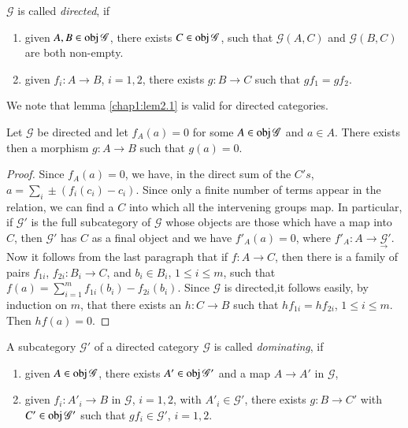 \begin{defi*}%
$\mathscr{G}$ is called {\em directed}, if 
\begin{enumerate}
\renewcommand{\labelenumi}{(\theenumi)}
\item given $A, B \in \operatorname{obj} \mathscr{G}$, there exists $C \in \operatorname{obj}
  \mathscr{G}$, such that $\mathscr{G}(A, C)$ and $\mathscr{G}(B, C)$
  are both non-empty. 

\item given $f_i : A \to B$, $i=1, 2$, there exists $g : B \to C $ such
  that $gf_1 = gf_2$. 
\end{enumerate}
\end{defi*}

We note that lemma \ref{chap1:lem2.1} is valid for directed
categories. 

\begin{lemma}\label{chap1:lem2.2} %
Let $\mathscr{G}$ be directed and let $f_A(a) = 0$ for some $A \in \operatorname{obj}
\mathscr{G}$ and $a \in A$. There exists then a morphism $g : A \to B$
such that $g(a) = 0$. 
\end{lemma}

\begin{proof}
Since $f_A(a) = 0$, we have, in the direct sum of the $C's$, $a = \sum
\limits_i \pm (f_i (c_i)-c_i)$. Since only a finite number of terms
appear in the relation, we can find a $C$ into which all the
intervening groups map. In particular, if $\mathscr{G}'$ is the full
subcategory of $\mathscr{G}$ whose objects are those which have a map into
$C$, then $\mathscr{G}'$ has $C$ as a final object and we have
$f'_A(a) =0$, where $f'_A : A \to \underset \to {\mathscr{G}}'$. Now
it follows from the last paragraph that if $f : A \to C$, then there
is a family of pairs $f_{1i}$, $f_{2i} : B_i \to C$, and $b_i \in
B_i$, $1 \leq i \leq m$, such that $f(a)= \sum \limits^m_{i=1}
f_{1i}(b_i) - f_{2i}(b_i)$. Since $\mathscr{G}$ is directed,\pageoriginale it
follows easily, by induction on $m$, that there exists an $h : C \to
B$ such that $hf_{1i} = hf_{2i}$, $1 \leq i \leq m$. Then $hf(a) =
0$. 
\end{proof}

\begin{defi*}%
A subcategory $\mathscr{G}'$ of a directed category $\mathscr{G}$ is
called {\em dominating}, if 
\begin{enumerate}
\renewcommand{\labelenumi}{(\theenumi)}
\item given $A \in \operatorname{obj} \mathscr{G}$, there exists $A' \in \operatorname{obj}
  \mathscr{G}'$ and a map $A \to A'$ in $\mathscr{G}$, 

\item given $f_i : A'_i \to B$ in $\mathscr{G}$, $ i =  1, 2$, with
  $A'_i \in \mathscr{G}'$, there exists $g : B \to C'$ with $C' \in
  \operatorname{obj} \mathscr{G}'$ such that $gf_i \in \mathscr{G}'$, $i = 1, 2$. 
\end{enumerate}
\end{defi*}


